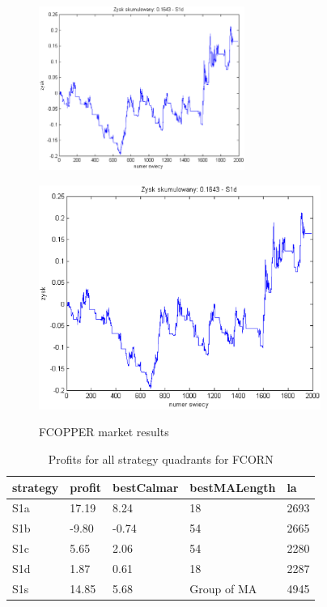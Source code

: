 \documentclass{tewiart}
\begin{document}
\begin{figure}[h]
\begin{minipage}{\linewidth}
\label{cztero}
\end{minipage}
\begin{minipage}{\linewidth}
\centering
\includegraphics[width=0.6\textwidth]{images/fcopperS1d.eps}
\label{mansard}
\end{minipage}
\begin{minipage}{.49\linewidth}
\centering
\includegraphics[width=0.82\textwidth]{images/fcopperS1s.eps}
\label{mansard}
\end{minipage}
\caption{FCOPPER market results}
\end{figure}
\newpage
\begin{table}[!t]
\caption{Profits for all strategy quadrants for FCORN}
 \begin{center}
 \begin{tabular}{|l|l|l|l|l|}
 \hline \textbf{strategy} & \textbf{profit} & \textbf{bestCalmar} & \textbf{bestMALength} & \textbf{la} \\ \hline
S1a & 17.19 & 8.24 & 18 & 2693\\ \hline
S1b & -9.80 & -0.74 & 54 & 2665\\ \hline
S1c & 5.65 & 2.06 & 54 & 2280\\ \hline
S1d & 1.87 & 0.61 & 18 & 2287\\ \hline
S1s & 14.85 & 5.68 & Group of MA & 4945\\
\hline \end{tabular}
 \end{center}
 \end{table}
\end{document}
